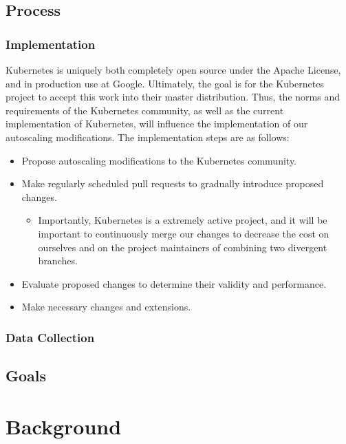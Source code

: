 \documentclass[twoside]{report}
\begin{document}
\section{Process}

\subsection{Implementation}

Kubernetes is uniquely both completely open source under the Apache License, and
in production use at Google.\cite{google-container-engine} Ultimately, the goal
is for the Kubernetes project to accept this work into their master distribution.
Thus, the norms and
requirements of the Kubernetes community, as well as the current implementation
of Kubernetes, will influence the implementation of our autoscaling
modifications. The implementation steps are as follows:

\begin{itemize}
  \item Propose autoscaling modifications to the Kubernetes community.
  \item Make regularly scheduled pull requests to gradually introduce proposed
    changes.
    \begin{itemize}
      \item Importantly, Kubernetes is a extremely active project, and it will
        be important to continuously merge our changes to decrease the cost on
        ourselves and on the project maintainers of combining two divergent
        branches.
    \end{itemize}
  \item Evaluate proposed changes to determine their validity and performance.
  \item Make necessary changes and extensions.
\end{itemize}

\subsection{Data Collection}

\section{Goals}


\chapter*{Background}
\end{document}
